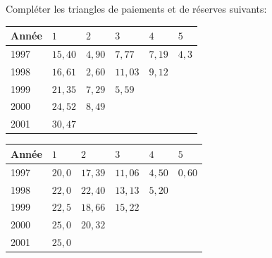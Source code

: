 \begin{exemple}
  Compléter les triangles de paiements et de réserves suivants:
  \begin{center}
    \begin{tabular}{|l|l l l l l|}\hline
      Année & $1$ & $2$ & $3$ & $4$ & $5$  \\ \hline
      1997 &$15,40$& $4,90$& $7,77$& $7,19$& $4,3$\\
      1998 &$16,61$& $2,60$& $11,03$& $9,12$& \\
      1999 &$21,35$& $7,29$& $5,59$& &\\
      2000 &$24,52$& $8,49$& & &\\
      2001 &$30,47$& & & &\\ \hline
    \end{tabular}
  \end{center}

  \begin{center}
    \begin{tabular}{|l|l l l l l|}\hline
      Année & $1$ & $2$ & $3$ & $4$ & $5$  \\ \hline
      1997 &$20,0$& $17,39$& $11,06$& $4,50$& $0,60$ \\
      1998 &$22,0$& $22,40$& $13,13$& $5,20$& \\
      1999 &$22,5$& $18,66$& $15,22$& & \\
      2000 &$25,0$& $20,32$& & &\\
      2001 &$25,0$&      & & & \\ \hline
    \end{tabular}
  \end{center}


\end{exemple}
